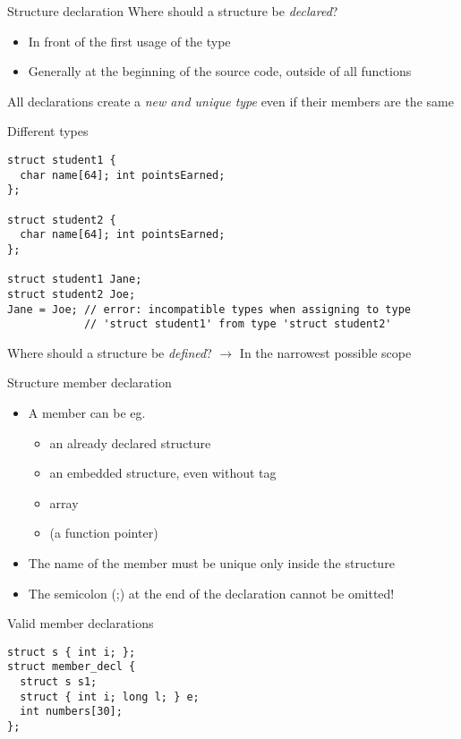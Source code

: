 \documentclass[usenames,dvipsnames,aspectratio=169]{beamer}
\begin{document}
\begin{frame}[fragile]{Structure declaration}
  Where should a structure be \emph{declared}?
  \begin{itemize}
    \item In front of the first usage of the type
    \item Generally at the beginning of the source code, outside of all functions
  \end{itemize}
  All declarations create a \emph{new and unique type} even if their members are the same
  \scriptsize
  \begin{exampleblock}{Different types}
    \begin{verbatim}
struct student1 {
  char name[64]; int pointsEarned;
};

struct student2 {
  char name[64]; int pointsEarned;
};

struct student1 Jane;
struct student2 Joe;
Jane = Joe; // error: incompatible types when assigning to type 
            // 'struct student1' from type 'struct student2'
\end{verbatim}
  \end{exampleblock}
  \normalsize
  Where should a structure be \emph{defined}? $\to$ In the narrowest possible scope
\end{frame}

\begin{frame}[fragile]{Structure member declaration}
  \small
  \begin{itemize}
    \item A member can be eg.
    \begin{itemize}
      \footnotesize
      \item an already declared structure
      \item an embedded structure, even without tag
      \item array
      \item (a function pointer)
    \end{itemize}
    \item The name of the member must be unique only inside the structure
    \item The semicolon (;) at the end of the declaration cannot be omitted!
  \end{itemize}
  \small
  \begin{exampleblock}{Valid member declarations}
    \begin{verbatim}
struct s { int i; };
struct member_decl {
  struct s s1;
  struct { int i; long l; } e;
  int numbers[30];
};
\end{verbatim}
  \end{exampleblock}
\end{frame}
\end{document}
